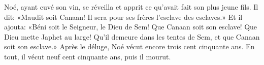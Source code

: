 Noé, ayant cuvé son vin, se réveilla
	et apprit ce qu’avait fait son plus jeune fils.
Il dit: «Maudit soit Canaan!
	Il sera pour ses frères l’esclave des esclaves.»
Et il ajouta: «Béni soit le Seigneur, le Dieu de Sem!
	Que Canaan soit son esclave!
Que Dieu mette Japhet au large!
	Qu’il demeure dans les tentes de Sem, et que Canaan soit son esclave.»
Après le déluge, Noé vécut encore trois cent cinquante ans.
	En tout, il vécut neuf cent cinquante ans, puis il mourut.
